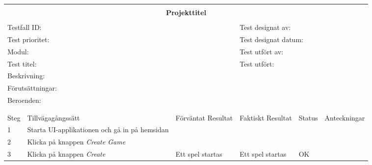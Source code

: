 \documentclass[10pt]{article}
\begin{document}
\begin{tabular}{| p{1cm}|  p{3cm} | p{3cm}| p{3cm}| p{2cm}| p{3cm}|}


	\hline
	\multicolumn{6}{|l|}{}\\
	\multicolumn{6}{|c|}{\huge{\textbf{Projekttitel}}}\\
	\multicolumn{6}{|l|}{}\\
	\hline
	\multicolumn{3}{|l|}{Testfall ID:}&\multicolumn{3}{|l|}{Test designat av:}\\
	\hline
	\multicolumn{3}{|l|}{Test prioritet:}&\multicolumn{3}{|l|}{Test designat datum:}\\
	\hline
	\multicolumn{3}{|l|}{Modul:}&\multicolumn{3}{|l|}{Test utfört av:}\\
	\hline
	\multicolumn{3}{|l|}{Test titel:}&\multicolumn{3}{|l|}{Test utfört:}\\
	\hline
	\multicolumn{3}{|l|}{Beskrivning:}&\multicolumn{3}{|l|}{}\\
	\hline
	\multicolumn{6}{|l|}{Förutsättningar:}\\
	\hline
	\multicolumn{6}{|l|}{Beroenden:}\\
	
	\hline
	\multicolumn{6}{|l|}{}\\
	\multicolumn{6}{|l|}{}\\
      	\hline
	Steg&Tillvägagångssätt&Förväntat Resultat&Faktiskt Resultat&Status&Anteckningar \\
	\hline
	1&Starta UI-applikationen och gå in på hemsidan&&&&\\
      	\hline
	2&Klicka på knappen \textit{Create Game}&&&&\\
      	\hline
	3&Klicka på knappen \textit{Create}&Ett spel startas&Ett spel startas& OK&\\
      	\hline
\end{tabular}
\end{document}
